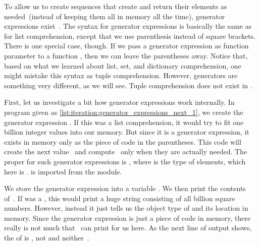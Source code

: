 To allow us to create  sequences that create and return their elements as needed~(instead of keeping them all in memory all the time), generator expressions exist~\cite{PEP289}.
The syntax for generator expressions is basically the same as for list comprehension, except that we use parenthesis instead of square brackets.
There is one special case, though.
If we pass a generator expression as function parameter to a function , then we can leave the parentheses away.%
%
%
\FloatBarrier%
%
%
%
\afterpage{\afterpage{\clearpage}}%
%
%
%
%
Notice that, based on what we learned about list, set, and dictionary comprehension, one might mistake this syntax as tuple comprehension.
However, generators are something very different, as we will see.
Tuple comprehension does not exist in \python.%
%
\begin{sloppypar}%
First, let us investigate a bit how generator expressions work internally.
In program  given as \cref{lst:iteration:generator_expressions_next_1}, we create the generator expression .
If this was a list comprehension, it would try to fit one billion integer values into our memory.
But since it is a generator expression, it exists in memory only as the piece of code in the parentheses.
This code will create the next value~ and compute~ only when they are actually needed.
The proper  for such generator expressions is , where  is the type of elements, which here is .
 is imported from the  module.%
\end{sloppypar}%
%
We store the generator expression into a variable .
We then print the contents of~.
If  was a , this would print a huge string consisting of all billion square numbers.
However, instead it just tells us the object type of  and its location in memory.
Since the generator expression is just a piece of code in memory, there really is not much that \python\ can print for us here.
As the next line of output shows, the  of  is , not  and neither~.

